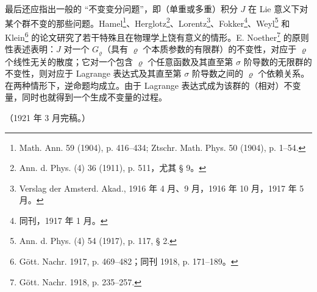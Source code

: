 \documentclass[11pt]{article}
\providecommand{\glqq}{“}
\providecommand{\grqq}{”}
\begin{document}
最后还应指出一般的 \glqq{}不变变分问题\grqq{}，即（单重或多重）积分 $J$ 在 Lie 意义下对某个群不变的那些问题。Hamel\footnote{Math. Ann. 59 (1904), p. 416--434; Ztschr. Math. Phys. 50 (1904), p. 1--54.}、Herglotz\footnote{Ann. d. Phys. (4) 36 (1911), p. 511，尤其 § 9。}、Lorentz\footnote{Verslag der Amsterd. Akad., 1916 年 4 月、9 月，1916 年 10 月，1917 年 5 月。}、Fokker\footnote{同刊，1917 年 1 月。}、Weyl\footnote{Ann. d. Phys. (4) 54 (1917), p. 117, § 2.} 和 Klein\footnote{Gött. Nachr. 1917, p. 469--482；同刊 1918, p. 171--189。} 的论文研究了若干特殊且在物理学上饶有意义的情形。E. Noether\footnote{Gött. Nachr. 1918, p. 235--257.} 的原则性表述表明：$J$ 对一个 $G_\varrho$（具有 $\varrho$ 个本质参数的有限群）的不变性，对应于 $\varrho$ 个线性无关的散度；它对一个包含 $\varrho$ 个任意函数及其直至第 $\sigma$ 阶导数的无限群的不变性，则对应于 Lagrange 表达式及其直至第 $\sigma$ 阶导数之间的 $\varrho$ 个依赖关系。在两种情形下，逆命题均成立。由于 Lagrange 表达式成为该群的（相对）不变量，同时也就得到一个生成不变量的过程。

\begin{center}
（1921 年 3 月完稿。）
\end{center}
\endgroup

\clearpage
\setcounter{footnote}{0}
\end{document}
